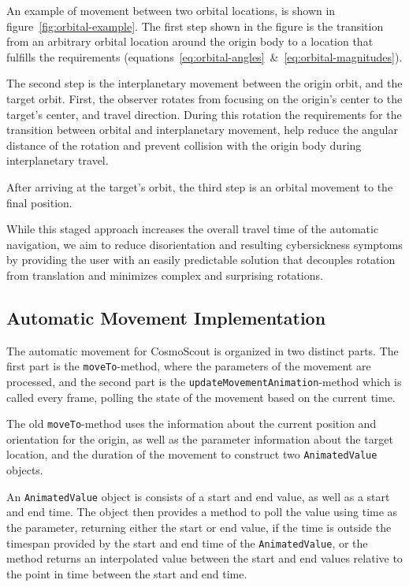 An example of movement between two orbital locations, is shown in figure~\ref{fig:orbital-example}.
The first step shown in the figure is the transition from an arbitrary orbital location around the origin body to a
location that fulfills the requirements (equations~\ref{eq:orbital-angles}~\&~\ref{eq:orbital-magnitudes}).

The second step is the interplanetary movement between the origin orbit, and the target orbit.
First, the observer rotates from focusing on the origin's center to the target's center, and travel direction.
During this rotation the requirements for the transition between orbital and interplanetary movement, help reduce the
angular distance of the rotation and prevent collision with the origin body during interplanetary travel.

After arriving at the target's orbit, the third step is an orbital movement to the final position.

While this staged approach increases the overall travel time of the automatic navigation, we aim to reduce
disorientation and resulting cybersickness symptoms by providing the user with an easily predictable solution that
decouples rotation from translation and minimizes complex and surprising rotations.


\subsection{Automatic Movement Implementation}\label{subsec:automatic-movement-implementation}

The automatic movement for CosmoScout is organized in two distinct parts.
The first part is the \texttt{moveTo}-method, where the parameters of the movement are processed, and the second
part is the \texttt{updateMovementAnimation}-method which is called every frame, polling the state of the
movement based on the current time.

The old \texttt{moveTo}-method uses the information about the current position and orientation for the origin, as
well as the parameter information about the target location, and the duration of the movement to construct two
\texttt{AnimatedValue} objects.

An \texttt{AnimatedValue} object is consists of a start and end value, as well as a start and end time.
The object then provides a method to poll the value using time as the parameter, returning either the start or
end value, if the time is outside the timespan provided by the start and end time of the
\texttt{AnimatedValue}, or the method returns an interpolated value between the start and end values relative
to the point in time between the start and end time.

